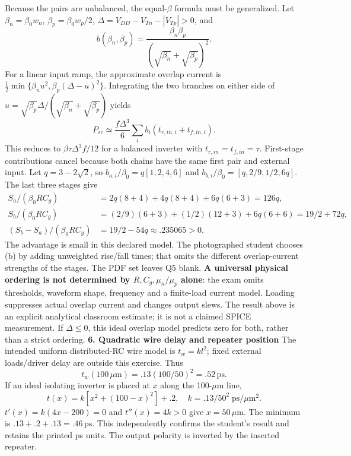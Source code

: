 \documentclass[10pt]{article}
\begin{document}
Because the pairs are unbalanced, the equal-$\beta$ formula must be generalized. Let $\beta_n=\beta_0w_n$, $\beta_p=\beta_0w_p/2$, $\Delta=V_{DD}-V_{Tn}-|V_{Tp}|>0$, and
\[b(\beta_n,\beta_p)=\frac{\beta_n\beta_p}{(\sqrt{\beta_n}+\sqrt{\beta_p})^2}.\]
For a linear input ramp, the approximate overlap current is $\tfrac12\min\{\beta_n u^2,\beta_p(\Delta-u)^2\}$. Integrating the two branches on either side of $u=\sqrt{\beta_p}\Delta/(\sqrt{\beta_n}+\sqrt{\beta_p})$ yields
\[P_{sc}\simeq\frac{f\Delta^3}{6}\sum_i b_i(t_{r,in,i}+t_{f,in,i}).\]
This reduces to $\beta\tau\Delta^3f/12$ for a balanced inverter with $t_{r,in}=t_{f,in}=\tau$. First-stage contributions cancel because both chains have the same first pair and external input. Let $q=3-2\sqrt2$, so $b_{a,i}/\beta_0=q[1,2,4,6]$ and $b_{b,i}/\beta_0=[q,2/9,1/2,6q]$. The last three stages give
\begin{align*}
S_a/(\beta_0RC_g)&=2q(8+4)+4q(8+4)+6q(6+3)=126q,\\
S_b/(\beta_0RC_g)&=(2/9)(6+3)+(1/2)(12+3)+6q(6+6)=19/2+72q,\\
(S_b-S_a)/(\beta_0RC_g)&=19/2-54q\approx .235065>0.
\end{align*}
The advantage is small in this declared model. The photographed student chooses (b) by adding unweighted rise/fall times; that omits the different overlap-current strengths of the stages. The PDF set leaves Q5 blank. \textbf{A universal physical ordering is not determined by $R,C_g,\mu_n/\mu_p$ alone}: the exam omits thresholds, waveform shape, frequency and a finite-load current model. Loading suppresses actual overlap current and changes output slews. The result above is an explicit analytical classroom estimate; it is not a claimed SPICE measurement. If $\Delta\le0$, this ideal overlap model predicts zero for both, rather than a strict ordering.
\newpage
\textbf{6. Quadratic wire delay and repeater position}
The intended uniform distributed-RC wire model is $t_w=k l^2$; fixed external loads/driver delay are outside this exercise. Thus
\[t_w(100\,\mu\mathrm m)=.13(100/50)^2=\boxed{.52\,\mathrm{ps}}.\]
If an ideal isolating inverter is placed at $x$ along the 100-$\mu$m line,
\[t(x)=k[x^2+(100-x)^2]+.2,\quad k=.13/50^2\;\mathrm{ps}/\mu\mathrm m^2.\]
$t'(x)=k(4x-200)=0$ and $t''(x)=4k>0$ give $x=50\,\mu\mathrm m$. The minimum is $\boxed{.13+.2+.13=.46\,\mathrm{ps}}$. This independently confirms the student's result and retains the printed ps units. The output polarity is inverted by the inserted repeater.
\end{document}
